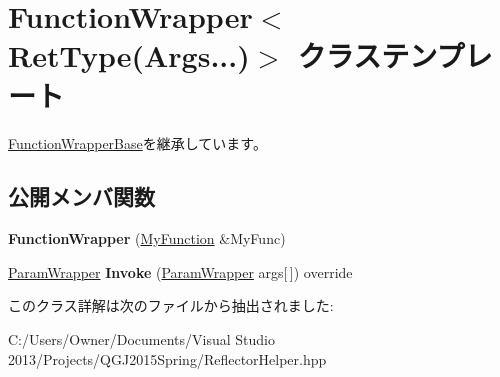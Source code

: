 \hypertarget{class_function_wrapper_3_01_ret_type_07_args_8_8_8_08_4}{}\section{Function\+Wrapper$<$ Ret\+Type(Args...)$>$ クラステンプレート}
\label{class_function_wrapper_3_01_ret_type_07_args_8_8_8_08_4}


\hyperlink{class_function_wrapper_base}{Function\+Wrapper\+Base}を継承しています。

\subsection*{公開メンバ関数}
\begin{DoxyCompactItemize}
\item 
{\bfseries Function\+Wrapper} (\hyperlink{classstd_1_1function}{My\+Function} \&My\+Func)\hypertarget{class_function_wrapper_3_01_ret_type_07_args_8_8_8_08_4_a4b3cf4cdc2d5a8ff96c7816beba64fe1}{}\label{class_function_wrapper_3_01_ret_type_07_args_8_8_8_08_4_a4b3cf4cdc2d5a8ff96c7816beba64fe1}

\item 
\hyperlink{struct_param_wrapper}{Param\+Wrapper} {\bfseries Invoke} (\hyperlink{struct_param_wrapper}{Param\+Wrapper} args\mbox{[}$\,$\mbox{]}) override\hypertarget{class_function_wrapper_3_01_ret_type_07_args_8_8_8_08_4_a31ddec152cf60ed8be9a900d7f0aacc0}{}\label{class_function_wrapper_3_01_ret_type_07_args_8_8_8_08_4_a31ddec152cf60ed8be9a900d7f0aacc0}

\end{DoxyCompactItemize}


このクラス詳解は次のファイルから抽出されました\+:\begin{DoxyCompactItemize}
\item 
C\+:/\+Users/\+Owner/\+Documents/\+Visual Studio 2013/\+Projects/\+Q\+G\+J2015\+Spring/Reflector\+Helper.\+hpp\end{DoxyCompactItemize}
